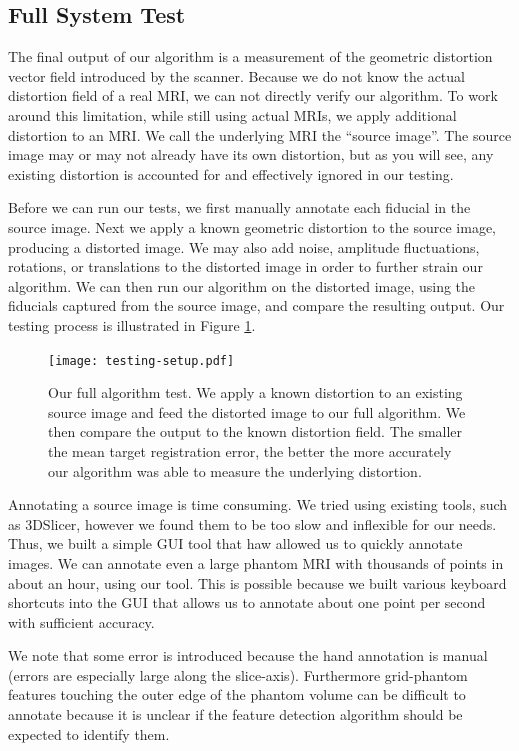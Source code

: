 \documentclass[12pt]{article}
\begin{document}
\subsection{Full System Test}

The final output of our algorithm is a measurement of the geometric distortion vector field introduced by the scanner.  Because we do not know the actual distortion field of a real MRI, we can not directly verify our algorithm.  To work around this limitation, while still using actual MRIs, we apply additional distortion to an MRI.  We call the underlying MRI the ``source image''.  The source image may or may not already have its own distortion, but as you will see, any existing distortion is accounted for and effectively ignored in our testing.

Before we can run our tests, we first manually annotate each fiducial in the source image.  Next we apply a known geometric distortion to the source image, producing a distorted image.  We may also add noise, amplitude fluctuations, rotations, or translations to the distorted image in order to further strain our algorithm.  We can then run our algorithm on the distorted image, using the fiducials captured from the source image, and compare the resulting output.  Our testing process is illustrated in Figure \ref{fig:testing-setup}.

\begin{figure}
    \centering
    \texttt{[image: testing-setup.pdf]}
    \caption{Our full algorithm test.  We apply a known distortion to an existing source image and feed the distorted image to our full algorithm.  We then compare the output to the known distortion field.  The smaller the mean target registration error, the better the more accurately our algorithm was able to measure the underlying distortion.}
    \label{fig:testing-setup}
\end{figure}

Annotating a source image is time consuming.  We tried using existing tools, such as 3DSlicer, however we found them to be too slow and inflexible for our needs.  Thus, we built a simple GUI tool that haw allowed us to quickly annotate images.  We can annotate even a large phantom MRI with thousands of points in about an hour, using our tool.  This is possible because we built various keyboard shortcuts into the GUI that allows us to annotate about one point per second with sufficient accuracy.

We note that some error is introduced because the hand annotation is manual (errors are especially large along the slice-axis).  Furthermore grid-phantom features touching the outer edge of the phantom volume can be difficult to annotate because it is unclear if the feature detection algorithm should be expected to identify them.
\end{document}
